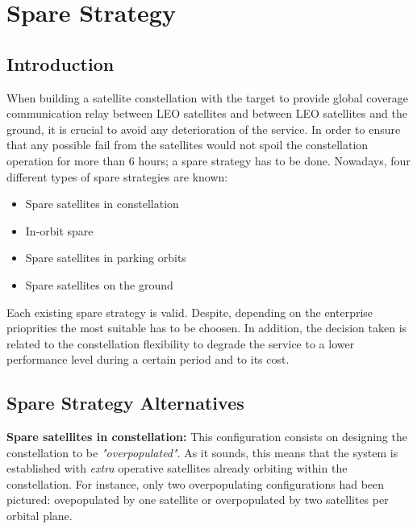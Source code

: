 \section{Spare Strategy}
\subsection{Introduction}
When building a satellite constellation with the target to provide global coverage communication relay between LEO satellites and between LEO satellites and the ground, it is crucial to avoid any deterioration of the service. In order to ensure that any possible fail from the satellites would not spoil the constellation operation for more than 6 hours; a spare strategy has to be done. Nowadays, four different types of spare strategies are known:
\begin{itemize} 

\item {Spare satellites in constellation}
\item {In-orbit spare} 
\item {Spare satellites in parking orbits} 
\item {Spare satellites on the ground} 

\end{itemize}
Each existing spare strategy is valid. Despite, depending on the enterprise prioprities the most suitable has to be choosen. In addition, the decision taken is related to the constellation flexibility to degrade the service to a lower performance level during a certain period and to its cost. 

\subsection{Spare Strategy Alternatives}

\textbf{Spare satellites in constellation:}
\newline
This configuration consists on designing the constellation to be \textit{ "overpopulated"}. As it sounds, this means that the system is established with \textit{extra} operative satellites already orbiting within the constellation. For instance, only two overpopulating configurations had been pictured: ovepopulated by one satellite or overpopulated by two satellites per orbital plane. 

